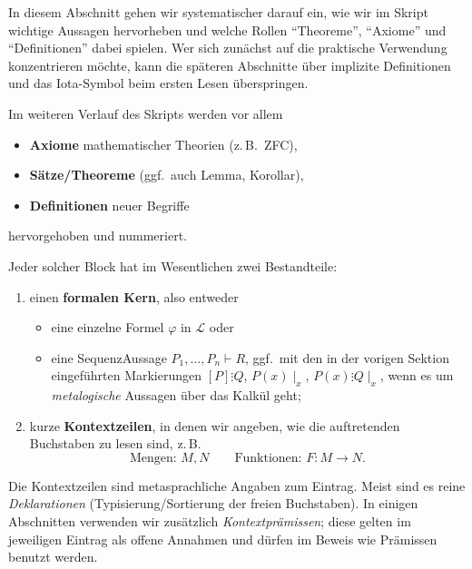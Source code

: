 \documentclass[main.tex]{subfiles}
\begin{document}
In diesem Abschnitt gehen wir systematischer darauf ein,
wie wir im Skript wichtige Aussagen hervorheben und welche
Rollen \enquote{Theoreme}, \enquote{Axiome} und \enquote{Definitionen}
dabei spielen. Wer sich zunächst auf die praktische Verwendung
konzentrieren möchte, kann die späteren Abschnitte über implizite
Definitionen und das Iota-Symbol beim ersten Lesen überspringen.

Im weiteren Verlauf des Skripts werden vor allem
\begin{itemize}
  \item \textbf{Axiome} mathematischer Theorien (z.\,B.\ ZFC),
  \item \textbf{Sätze/Theoreme} (ggf.\ auch Lemma, Korollar),
  \item \textbf{Definitionen} neuer Begriffe
\end{itemize}
hervorgehoben und nummeriert.

Jeder solcher Block hat im Wesentlichen zwei Bestandteile:
\begin{enumerate}
  \item einen \textbf{formalen Kern}, also entweder
        \begin{itemize}
          \item eine einzelne Formel \(\varphi\) in \(\mathcal L\) oder
          \item eine Sequenz\-Aussage \(P_1,\dots,P_n \vdash R\),
                ggf.\ mit den in der vorigen Sektion eingeführten
                Markierungen \([P]\vdots Q\), \(P(x)\mid_x\),
                \(P(x)\vdots Q\mid_x\), wenn es um
                \emph{metalogische} Aussagen über das Kalkül geht;
        \end{itemize}
  \item kurze \textbf{Kontextzeilen}, in denen wir angeben, wie die
        auftretenden Buchstaben zu lesen sind, z.\,B.
        \[
          \text{Mengen: } M,N \qquad
          \text{Funktionen: } F\colon M\to N.
        \]
\end{enumerate}

Die Kontextzeilen sind metasprachliche Angaben zum Eintrag.
Meist sind es reine \emph{Deklarationen} (Typisierung/Sortierung der freien
Buchstaben). In einigen Abschnitten verwenden wir zusätzlich
\emph{Kontextprämissen}; diese gelten im jeweiligen Eintrag als offene
Annahmen und dürfen im Beweis wie Prämissen benutzt werden.
\end{document}

